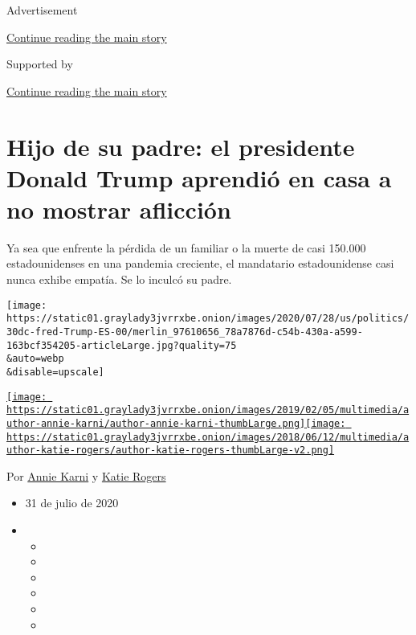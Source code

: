 Advertisement

\protect\hyperlink{after-top}{Continue reading the main story}

Supported by

\protect\hyperlink{after-sponsor}{Continue reading the main story}

\hypertarget{hijo-de-su-padre-el-presidente-donald-trump-aprendiuxf3-en-casa-a-no-mostrar-aflicciuxf3n}{%
\section{Hijo de su padre: el presidente Donald Trump aprendió en casa a
no mostrar
aflicción}\label{hijo-de-su-padre-el-presidente-donald-trump-aprendiuxf3-en-casa-a-no-mostrar-aflicciuxf3n}}

Ya sea que enfrente la pérdida de un familiar o la muerte de casi
150.000 estadounidenses en una pandemia creciente, el mandatario
estadounidense casi nunca exhibe empatía. Se lo inculcó su padre.

\texttt{[image: https://static01.graylady3jvrrxbe.onion/images/2020/07/28/us/politics/30dc-fred-Trump-ES-00/merlin\_97610656\_78a7876d-c54b-430a-a599-163bcf354205-articleLarge.jpg?quality=75\\\&auto=webp\\\&disable=upscale]}

\href{https://www.nytimes3xbfgragh.onion/by/annie-karni}{\texttt{[image: https://static01.graylady3jvrrxbe.onion/images/2019/02/05/multimedia/author-annie-karni/author-annie-karni-thumbLarge.png]}}\href{https://www.nytimes3xbfgragh.onion/by/katie-rogers}{\texttt{[image: https://static01.graylady3jvrrxbe.onion/images/2018/06/12/multimedia/author-katie-rogers/author-katie-rogers-thumbLarge-v2.png]}}

Por \href{https://www.nytimes3xbfgragh.onion/by/annie-karni}{Annie
Karni} y \href{https://www.nytimes3xbfgragh.onion/by/katie-rogers}{Katie
Rogers}

\begin{itemize}
\item
  31 de julio de 2020
\item
  \begin{itemize}
  \item
  \item
  \item
  \item
  \item
  \item
  \end{itemize}
\end{itemize}


